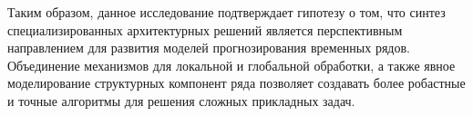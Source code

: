Таким образом, данное исследование подтверждает гипотезу о том, что 
синтез специализированных архитектурных решений является перспективным 
направлением для развития моделей прогнозирования временных рядов. 
Объединение механизмов для локальной и глобальной обработки, а также 
явное моделирование структурных компонент ряда позволяет создавать более 
робастные и точные алгоритмы для решения сложных прикладных задач.

